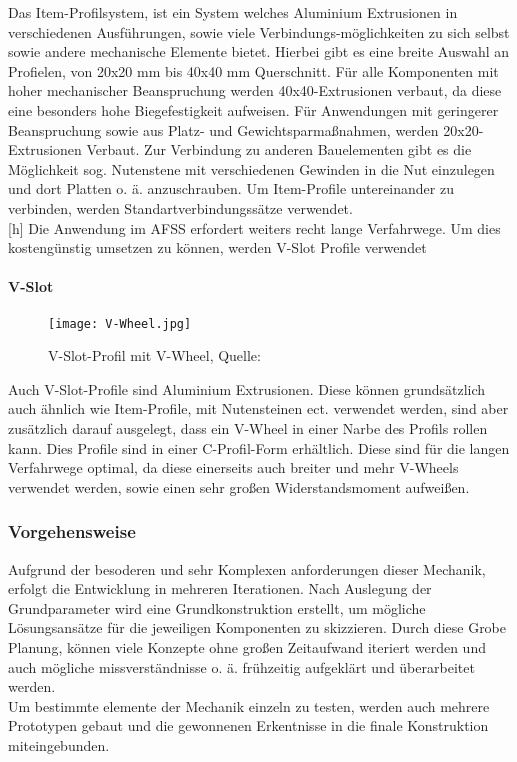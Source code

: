 Das Item-Profilsystem, ist ein System welches Aluminium Extrusionen in verschiedenen Ausführungen, sowie viele Verbindungs-möglichkeiten zu sich selbst sowie andere mechanische Elemente bietet. Hierbei gibt es eine breite Auswahl an Profielen, von 20x20 mm bis 40x40 mm Querschnitt. Für alle Komponenten mit hoher mechanischer Beanspruchung werden 40x40-Extrusionen verbaut, da diese eine besonders hohe Biegefestigkeit aufweisen. Für Anwendungen mit geringerer Beanspruchung sowie aus Platz- und Gewichtsparmaßnahmen, werden 20x20-Extrusionen Verbaut. 
Zur Verbindung zu anderen Bauelementen gibt es die Möglichkeit sog. Nutenstene mit verschiedenen Gewinden in die Nut einzulegen und dort Platten o. ä. anzuschrauben. Um Item-Profile untereinander zu verbinden, werden Standartverbindungssätze verwendet. \\
\vspace{4mm}[h]
Die Anwendung im AFSS erfordert weiters recht lange Verfahrwege. Um dies kostengünstig umsetzen zu können, werden V-Slot Profile verwendet

\paragraph{V-Slot}

\begin{wrapfigure}{R}{0.3\textwidth}
    \texttt{[image: V-Wheel.jpg]}
    \centering
    \caption{V-Slot-Profil mit V-Wheel, Quelle: \cite{v_slot_wheel}}
\end{wrapfigure}

Auch V-Slot-Profile sind Aluminium Extrusionen. Diese können grundsätzlich auch ähnlich wie Item-Profile, mit Nutensteinen ect. verwendet werden, sind aber zusätzlich darauf ausgelegt, dass ein V-Wheel in einer Narbe des Profils rollen kann. Dies Profile sind in einer C-Profil-Form erhältlich. Diese sind für die langen Verfahrwege optimal, da diese einerseits auch breiter und mehr V-Wheels verwendet werden, sowie einen sehr großen Widerstandsmoment aufweißen. 


\subsubsection{Vorgehensweise}
Aufgrund der besoderen und sehr Komplexen anforderungen dieser Mechanik, erfolgt die Entwicklung in mehreren Iterationen. Nach Auslegung der Grundparameter wird eine Grundkonstruktion erstellt, um mögliche Lösungsansätze für die jeweiligen Komponenten zu skizzieren. Durch diese Grobe Planung, können viele Konzepte ohne großen Zeitaufwand iteriert werden und auch mögliche missverständnisse o. ä. frühzeitig aufgeklärt und überarbeitet werden. \\
Um bestimmte elemente der Mechanik einzeln zu testen, werden auch mehrere Prototypen gebaut und die gewonnenen Erkentnisse in die finale Konstruktion miteingebunden. \\

